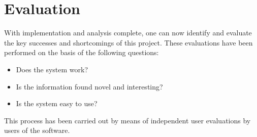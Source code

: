 \chapter{Evaluation}
\label{cha:eval}
With implementation and analysis complete, one can now identify and evaluate the key successes and shortcomings of this project. These evaluations have been performed on the basis of the following questions:

\begin{itemize}
\item Does the system work?
\item Is the information found novel and interesting?
\item Is the system easy to use?
\end{itemize}

This process has been carried out by means of independent user evaluations by users of the software.


